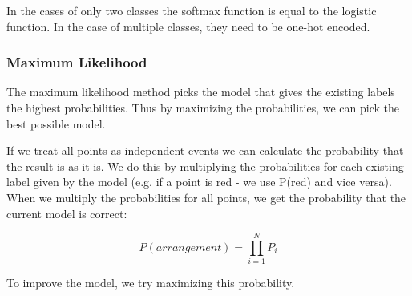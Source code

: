 \documentclass{article}
\begin{document}
In the cases of only two classes the softmax function is equal to the logistic function. In the case of multiple classes, they need to be one-hot encoded.

\subsubsection{Maximum Likelihood}
The maximum likelihood method picks the model that gives the existing labels the highest probabilities. Thus by maximizing the probabilities, we can pick the best possible model.

If we treat all points as independent events we can calculate the probability that the result is as it is. We do this by multiplying the probabilities for each existing label given by the model (e.g. if a point is red - we use P(red) and vice versa). When we multiply the probabilities for all points, we get the probability that the current model is correct:

\begin{equation}
  P(arrangement) = \prod_{i = 1}^{N} P_i
\end{equation}

To improve the model, we try maximizing this probability.
\end{document}
